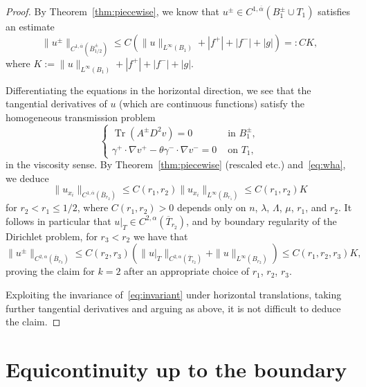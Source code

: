 \documentclass[letter,11pt]{amsart}
\newcommand{\tr}[1]{\operatorname{Tr}(#1)}
\theoremstyle{definition}
\numberwithin{equation}{section}
\begin{document}
\begin{proof}
By Theorem~\ref{thm:piecewise}, we know that $u^{\pm} \in C^{1,\overline{\alpha}}(B_1^{\pm} \cup T_1)$
satisfies an estimate
\begin{equation}
\label{eq:wha}
\|u^{\pm}\|_{C^{1,\overline{\alpha}}(\overline{B}^{\pm}_{1/2})} \leq C \left(\|u\|_{L^{\infty}(B_1)} + |f^{+}| +|f^{-}| + |g| \right) =: C K,
\end{equation}
where $K := \|u\|_{L^{\infty}(B_1)} + |f^{+}| +|f^{-}| + |g|$.

\medskip

Differentiating the equations in the horizontal direction, we see that the tangential derivatives of $u$ (which are continuous functions) satisfy the homogeneous transmission problem
\begin{equation}
\label{eq:invariant}
\begin{cases}
\tr{A^{\pm} D^2 v} = 0 & \text{ in } B_1^{\pm},\\
\gamma^{+} \cdot \nabla v^{+}  - \theta \gamma^{-} \cdot \nabla v^{-}= 0 & \text{ on } T_1,
\end{cases}
\end{equation}
in the viscosity sense.
By Theorem~\ref{thm:piecewise} (rescaled etc.) and~\eqref{eq:wha}, we deduce
\[
\|u_{x_i}\|_{C^{1,\overline{\alpha}}(\overline{B}_{r_2})} \leq C(r_1,r_2) \|u_{x_i}\|_{L^{\infty}(B_{r_1})} \leq C(r_1, r_2) K
\]
for $r_2 < r_1 \leq 1/2$, where $C(r_1,r_2) > 0$ depends only on $n$, $\lambda$, $\Lambda$, $\mu$, $r_1$, and $r_2$.
It follows in particular that $u|_{T} \in C^{2,\alpha}(\overline{T}_{r_2})$,
and by boundary regularity of the Dirichlet problem,
for $r_3 < r_2$ we have that
\[
\|u^{\pm}\|_{C^{2,\alpha}(\overline{B}_{r_3})} \leq C(r_2,r_3) \left( \|u|_{T}\|_{C^{2,\alpha}(\overline{T}_{r_2})} + \|u\|_{L^{\infty}(B_{r_2})}\right) \leq C(r_1, r_2, r_3) K,
\]
proving the claim for $k =2$ after an appropriate choice of $r_1$, $r_2$, $r_3$.

\medskip

Exploiting the invariance of~\eqref{eq:invariant} under horizontal translations, 
taking further tangential derivatives and arguing as above, it is not difficult to deduce the claim.
\end{proof}


\section{Equicontinuity up to the boundary}
\label{sec:barrier}
\end{document}
